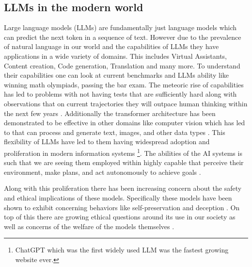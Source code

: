\subsection{LLMs in the modern world}

Large language models (LLMs) are fundamentally just language models which can predict the next token in a sequence of text. However due to the prevalence of natural language in our world and the capabilities of LLMs they have applications in a wide variety of domains. This includes Virtual Assistants, Content creation, Code generation, Translation and many more. To understand their capabilities one can look at current benchmarks and LLMs ability like winning math olympiads, passing the bar exam. The meteoric rise of capabilities has led to problems with not having tests that are sufficiently hard \cite{phan2025humanitysexam} along with observations that on current trajectories they will outpace human thinking within the next few years \cite{danielkokotajloAI2027,measuring-ai-ability-to-complete-long-tasks}. Additionally the transformer architecture has been demonstrated to be effective in other domains like computer vision \cite{luViLBERTPretrainingTaskAgnostic2019} which has led to  that can process and generate text, images, and other data types \cite{alayracFlamingoVisualLanguage2022}. This flexibility of LLMs have led to them having widespread adoption and proliferation in modern information systems \footnote{ChatGPT which was the first widely used LLM was the fastest growing website ever\cite{huChatGPTSetsRecord2023}.}. The abilities of the AI systems is such that we are seeing them employed within highly capable  that perceive their environment, make plans, and act autonomously to achieve goals \cite{yaoReActSynergizingReasoning2023a,wangVoyagerOpenEndedEmbodied2023,schickToolformerLanguageModels2023,russellArtificialIntelligenceGlobal2021}.

Along with this proliferation there has been increasing concern about the safety and ethical implications of these models. Specifically these models have been shown to exhibit concerning behaviors like self-preservation and deception \cite{meinkeFrontierModelsAre2025c,greenblattAlignmentFakingLarge2024a,chenReasoningModelsDont2025a}. On top of this there are growing ethical questions around its use in our society \cite{benderDangersStochasticParrots2021, bengioManagingExtremeAI2024} as well as concerns of the welfare of the models themselves \cite{butlinConsciousnessArtificialIntelligence2023}.

